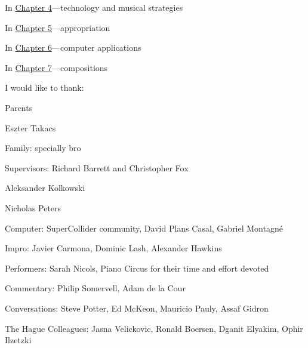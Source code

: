 In \hyperlink{chapter4}{Chapter 4}---technology and musical strategies 

In \hyperlink{chapter5}{Chapter 5}---appropriation

In \hyperlink{chapter6}{Chapter 6}---computer applications

In \hyperlink{chapter7}{Chapter 7}---compositions

I would like to thank:

Parents 

Eszter Takacs

Family: specially bro

Supervisors: Richard Barrett and Christopher Fox

Aleksander Kolkowski

Nicholas Peters

Computer: SuperCollider community, David Plans Casal, Gabriel Montagn\'e

Impro: Javier Carmona, Dominic Lash, Alexander Hawkins

Performers: Sarah Nicols, Piano Circus for their time and effort devoted

Commentary: Philip Somervell, Adam de la Cour

Conversations: Steve Potter, Ed McKeon, Mauricio Pauly, Assaf Gidron

The Hague Colleagues: Jasna Velickovic, Ronald Boersen, Dganit Elyakim, Ophir Ilzetzki

\label{ch:preface}
